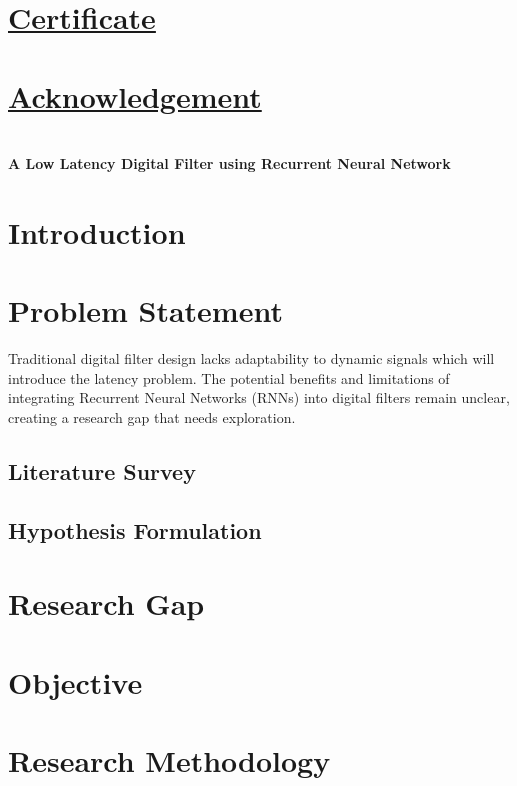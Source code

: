 \documentclass[12pt, a4paper, twoside]{article}
\date{}
\newcommand{\Title}[1]{{\LARGE \centering \hrulefill\\ \textbf{#1}\\ \hrulefill}}
\begin{document}
	\pagestyle{empty}
	
	\section*{\centering \LARGE \underline{Certificate}}
	\vspace{1\baselineskip}
	
	\section*{\centering \LARGE \underline{Acknowledgement}}
	\vspace{1\baselineskip}
	
	\newpage
	\tableofcontents
	\newpage
	\pagestyle{plain}
	\Title{A Low Latency Digital Filter using Recurrent Neural Network}
	\section{Introduction}
	
	\section{Problem Statement}
	Traditional digital filter design lacks adaptability to dynamic signals which will introduce the latency problem. The potential benefits and limitations of integrating Recurrent Neural Networks (RNNs) into digital filters remain unclear, creating a research gap that needs exploration.
	\subsection{Literature Survey}
	
	\subsection{Hypothesis Formulation}
	
	\section{Research Gap}
	
	\section{Objective}
	
	\section{Research Methodology}
	
\end{document}
